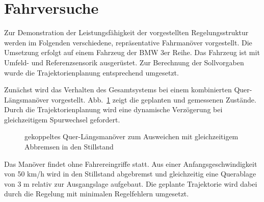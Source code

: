 \section{Fahrversuche}
Zur Demonstration der Leistungsfähigkeit der vorgestellten Regelungsstruktur werden im Folgenden verschiedene,  repräsentative Fahrmanöver vorgestellt.  Die Umsetzung erfolgt auf einem Fahrzeug der BMW 3er Reihe.  Das Fahrzeug ist mit Umfeld- und Referenzsensorik ausgerüstet. Zur Berechnung der Sollvorgaben wurde die Trajektorienplanung entsprechend \cite{Rathgeber2015b} umgesetzt. 

Zunächst wird das Verhalten des Gesamtsystems bei einem kombinierten Quer-Längsmanöver vorgestellt.  Abb.~\ref{abb_LQ_Bremsung} zeigt die geplanten und gemessenen Zustände. 
Durch die Trajektorienplanung wird eine dynamische Verzögerung bei gleichzeitigem Spurwechsel gefordert.        
 \begin{figure}[thpb]
 	 \centering
	 \setlength\figureheight{5.5cm} 
	 \setlength\figurewidth{10.5cm}
	   
      \begin{center}
       		\caption{gekoppeltes Quer-Längsmanöver zum Ausweichen mit gleichzeitigem Abbremsen in den Stillstand}
     		 \label{abb_LQ_Bremsung}
       \end{center}
   \end{figure}   
Das Manöver findet ohne Fahrereingriffe statt. Aus einer Anfangsgeschwindigkeit von 50 km/h wird in den Stillstand abgebremst und gleichzeitig eine Querablage von 3 m relativ zur Ausgangslage aufgebaut. Die geplante Trajektorie wird dabei durch die Regelung mit minimalen Regelfehlern umgesetzt.
 
